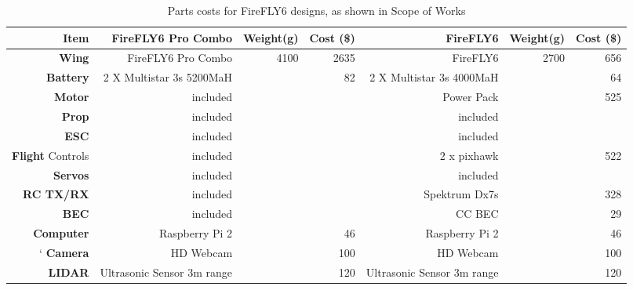 \begin{landscape}
	\begin{table}[!htbp]
		\centering
		\caption{Parts costs for FireFLY6 designs, as shown in Scope of Works}
		\begin{tabular}{|r|r|r|r|r|r|r|}
			\hline
			\textbf{Item}            & \textbf{FireFLY6 Pro Combo}   & \textbf{Weight(g)} & \textbf{Cost (\$)} & \textbf{FireFLY6} & \textbf{Weight(g)} & \textbf{Cost (\$)}\\
			\hline
			\textbf{Wing}            & FireFLY6 Pro Combo        & 4100       & 2635  & FireFLY6                  & 2700       & 656   \\
			\hline
			\textbf{Battery}         & 2 X Multistar 3s 5200MaH   &            & 82    & 2 X Multistar 3s 4000MaH   &            & 64    \\
			\hline
			\textbf{Motor}           & included                   &            &       & Power Pack                 &            & 525   \\
			\hline
			\textbf{Prop}            & included                   &            &       & included                   &            &       \\
			\hline
			\textbf{ESC}             & included                   &            &       & included                   &            &       \\
			\hline
			\textbf{Flight} Controls & included                   &            &       & 2 x pixhawk                &            & 522   \\
			\hline
			\textbf{Servos}          & included                   &            &       & included                   &            &       \\
			\hline
			\textbf{RC TX/RX}        & included                   &            &       & Spektrum Dx7s              &            & 328   \\
			\hline
			\textbf{BEC}             & included                   &            &       & CC BEC                     &            & 29    \\
			\hline
			\textbf{Computer}        & Raspberry Pi 2             &            & 46    & Raspberry Pi 2             &            & 46    \\
			\hline`
			\textbf{Camera}          & HD Webcam                  &            & 100   & HD Webcam                  &            & 100   \\
			\hline
			\textbf{LIDAR}           & Ultrasonic Sensor 3m range &            & 120   & Ultrasonic Sensor 3m range &            & 120   \\

\end{tabular}
\end{table}
\end{landscape}
